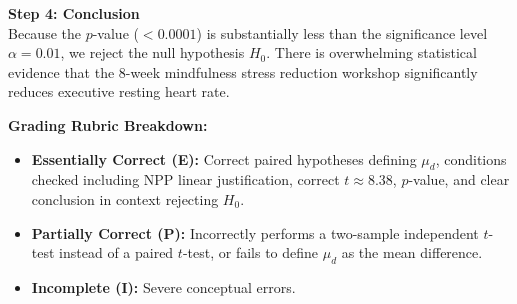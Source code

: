 \begin{frqrubricbox}
\textbf{Step 4: Conclusion}\\
Because the $p$-value ($< 0.0001$) is substantially less than the significance level $\alpha = 0.01$, we reject the null hypothesis $H_0$. There is overwhelming statistical evidence that the 8-week mindfulness stress reduction workshop significantly reduces executive resting heart rate.

\textbf{Grading Rubric Breakdown:}\\
\begin{itemize}
  \item \textbf{Essentially Correct (E):} Correct paired hypotheses defining $\mu_d$, conditions checked including NPP linear justification, correct $t \approx 8.38$, $p$-value, and clear conclusion in context rejecting $H_0$.
  \item \textbf{Partially Correct (P):} Incorrectly performs a two-sample independent $t$-test instead of a paired $t$-test, or fails to define $\mu_d$ as the mean difference.
  \item \textbf{Incomplete (I):} Severe conceptual errors.
\end{itemize}
\end{frqrubricbox}

